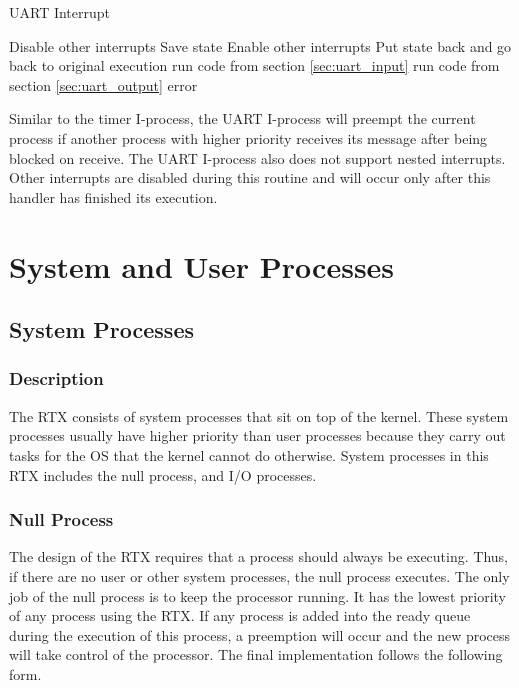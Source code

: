 \documentclass[12pt]{report}
\begin{document}
\begin{algorithm}
    \caption{UART Interrupt}
    \begin{algorithmic}[1]
          \State Disable other interrupts
          \State Save state
          \State {}
          \State Enable other interrupts
          \State Put state back and go back to original execution
      \EndFunction
      \bigskip
              \State run code from section \ref{sec:uart_input}
              \State run code from section \ref{sec:uart_output}
          \Else
              \State error
          \EndIf
      \EndFunction
  \end{algorithmic}
\end{algorithm}

Similar to the timer I-process, the UART I-process will preempt the current process if another process with higher priority receives its message after being blocked on receive. The UART I-process also does not support nested interrupts. Other interrupts are disabled during this routine and will occur only after this handler has finished its execution.


\chapter{System and User Processes}

\section{System Processes}
\subsection{Description}
The RTX consists of system processes that sit on top of the kernel. These system processes usually have higher priority than user processes because they carry out tasks for the OS that the kernel cannot do otherwise. System processes in this RTX includes the null process, and I/O processes.

\subsection{Null Process}
The design of the RTX requires that a process should always be executing. Thus, if there are no user or other system processes, the null process executes. The only job of the null process is to keep the processor running. It has the lowest priority of any process using the RTX. If any process is added into the ready queue during the execution of this process, a preemption will occur and the new process will take control of the processor. The final implementation follows the following form.
\end{document}
